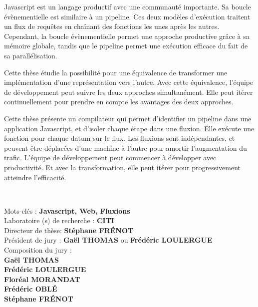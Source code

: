\begin{framed}
{Javascript est un langage productif avec une communauté importante.
Sa boucle évènementielle est similaire à un pipeline.
Ces deux modèles d’exécution traitent un flux de requêtes en chaînant des fonctions les unes après les autres.
Cependant, la boucle évènementielle permet une approche productive grâce à sa mémoire globale, tandis que le pipeline permet une exécution efficace du fait de sa parallélisation.

Cette thèse étudie la possibilité pour une équivalence de transformer une implémentation d'une représentation vers l'autre.
Avec cette équivalence, l'équipe de développement peut suivre les deux approches simultanément.
Elle peut itérer continuellement pour prendre en compte les avantages des deux approches.

Cette thèse présente un compilateur qui permet d'identifier un pipeline dans une application Javascript, et d'isoler chaque étape dans une fluxion.
Elle exécute une fonction pour chaque datum sur le flux.
Les fluxions sont indépendantes, et peuvent être déplacées d'une machine à l'autre pour amortir l'augmentation du trafic.
L'équipe de développement peut commencer à développer avec productivité.
Et avec la transformation, elle peut itérer pour progressivement atteindre l’efficacité.

~
}

\noindent %
Mots-clés : \textbf{Javascript, Web, Fluxions}\\[3pt]
Laboratoire (s) de recherche : \textbf{CITI}\\[3pt]
Directeur de thèse: \textbf{Stéphane \MakeUppercase{Frénot}}\\[3pt]
Président de jury : \textbf{Gaël \MakeUppercase{Thomas}} ou \textbf{Frédéric \MakeUppercase{Loulergue}~}\\[3pt]
Composition du jury :\\
\textbf{Gaël \MakeUppercase{Thomas}}\\
\textbf{Frédéric \MakeUppercase{Loulergue}}\\
\textbf{Floréal \MakeUppercase{Morandat}}\\
\textbf{Frédéric \MakeUppercase{Oblé}}\\   
\textbf{Stéphane \MakeUppercase{Frénot}}
\end{framed}

\restoregeometry
\eject